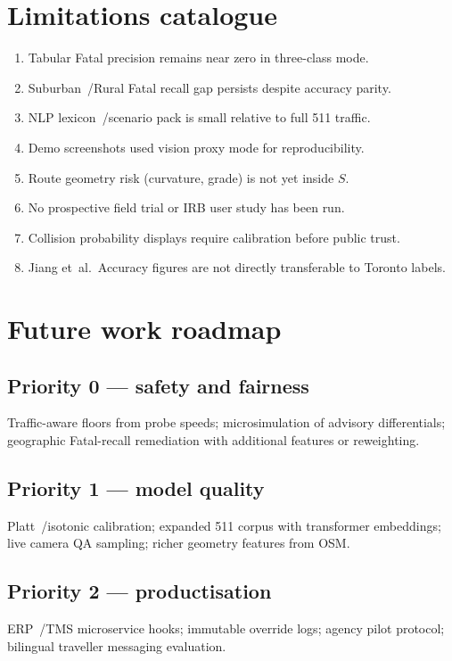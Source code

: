\documentclass[11pt,a4paper]{article}
\begin{document}
\newpage
\section*{Limitations catalogue}
\label{sec:limits}
\begin{enumerate}[leftmargin=1.5em]
  \item Tabular Fatal precision remains near zero in three-class mode.
  \item Suburban~/Rural Fatal recall gap persists despite accuracy parity.
  \item NLP lexicon~/scenario pack is small relative to full 511 traffic.
  \item Demo screenshots used vision proxy mode for reproducibility.
  \item Route geometry risk (curvature, grade) is not yet inside $S$.
  \item No prospective field trial or IRB user study has been run.
  \item Collision probability displays require calibration before public trust.
  \item Jiang et~al.\ Accuracy figures are not directly transferable to Toronto labels.
\end{enumerate}

\newpage
\section*{Future work roadmap}
\label{sec:futuremap}
\subsection*{Priority 0 --- safety and fairness}
Traffic-aware floors from probe speeds; microsimulation of advisory differentials; geographic Fatal-recall remediation with additional features or reweighting.

\subsection*{Priority 1 --- model quality}
Platt~/isotonic calibration; expanded 511 corpus with transformer embeddings; live camera QA sampling; richer geometry features from OSM.

\subsection*{Priority 2 --- productisation}
ERP~/TMS microservice hooks; immutable override logs; agency pilot protocol; bilingual traveller messaging evaluation.
\end{document}
